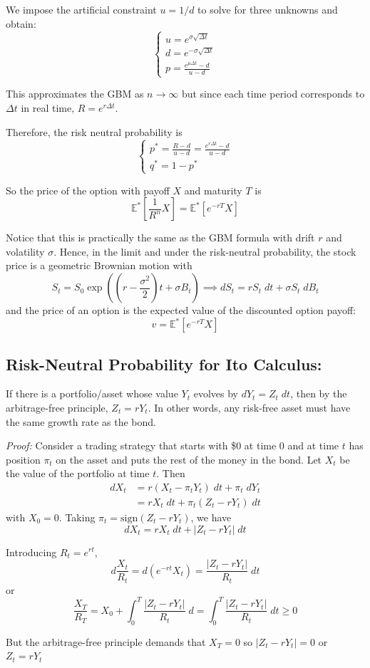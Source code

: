\documentclass[12pt]{report}
\newcommand{\E}{\mathbb{E}}
\newcommand{\abs}[1]{\left\vert #1 \right\vert}
\newenvironment*{proof}[1][blue]{
\begin{tcolorbox}[
    parbox=false,
    colback=#1!5!white,
    colframe=#1!75!black,
    breakable
]}
{\end{tcolorbox}}
\begin{document}
    We impose the artificial constraint $u = 1/d$ to solve for three unknowns and obtain:
    \[\begin{cases}
        u = e^{\sigma \sqrt{\Delta t}}\\
        d = e^{-\sigma \sqrt{\Delta t}}\\
        p = \frac{e^{\mu\Delta t} - d}{u - d}
    \end{cases}\]

    This approximates the GBM as $n \to \infty$ but since each time period corresponds to $\Delta t$ in real time, $R = e^{r \Delta t}$. 

    Therefore, the risk neutral probability is
    \[\begin{cases}
        p^* = \frac{R - d}{u - d} = \frac{e^{r\Delta t} - d}{u - d}\\ 
        q^* = 1 - p^*
    \end{cases}\]

    So the price of the option with payoff $X$ and maturity $T$ is 
    \[\E^*[\frac{1}{R^n} X] = \E^*[e^{-rT} X]\]

    Notice that this is practically the same as the GBM formula with drift $r$ and volatility $\sigma$. Hence, in the limit and under the risk-neutral probability, the stock price is a geometric Brownian motion with 
    \[S_t = S_0 \exp((r - \frac{\sigma^2}{2})t + \sigma B_t) \implies dS_t = rS_t \; dt + \sigma S_t \; dB_t\]
    and the price of an  option  is the expected value of the discounted option payoff:
    \[v = \E^*[e^{-rT} X]\]

\subsection*{Risk-Neutral Probability for Ito Calculus:} 

If there is a portfolio/asset whose value $Y_t$ evolves by $dY_t = Z_t\; dt$, then by the arbitrage-free principle, $Z_t = rY_t$. In other words, any risk-free asset must have the same growth rate as the bond. 

\begin{proof}
    \emph{Proof:} Consider a trading strategy that starts with \$0 at time $0$ and at time $t$ has position $\pi_t$ on the asset and puts the rest of the money in the bond. Let $X_t$ be the value of the portfolio at time $t$. Then
    \begin{align*}
        dX_t &= r(X_t - \pi_t Y_t)\; dt + \pi_t \; dY_t\\
        &= rX_t \; dt + \pi_t (Z_t - rY_t)\; dt
    \end{align*}
    with $X_0 = 0$. Taking $\pi_t = \text{sign}(Z_t - rY_t)$, we have
    \[dX_t = rX_t\; dt + \abs{Z_t - rY_t}\; dt\]
    
    Introducing $R_t = e^{rt}$, 
    \[d\frac{X_t}{R_t} = d(e^{-rt} X_t) = \frac{\abs{Z_t - rY_t}}{R_t}\; dt\]
    or 
    \[\frac{X_T}{R_T} = X_0 + \int_0^T \frac{\abs{Z_t - rY_t}}{R_t}\; d = \int_0^T \frac{\abs{Z_t - rY_t}}{R_t}\; dt \geq 0\]
    
    But the arbitrage-free principle demands that $X_T = 0$ so $\abs{Z_t - rY_t} =0$ or $Z_t = rY_t$
\end{proof}
\end{document}
